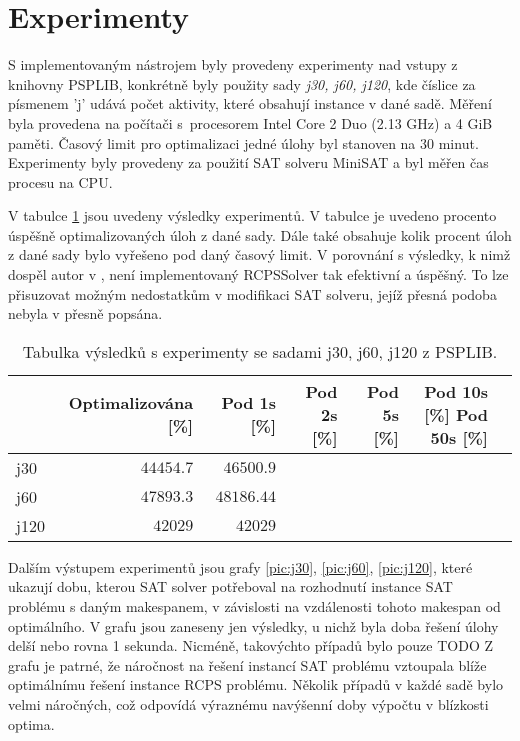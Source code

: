 \documentclass[a4paper, 12pt]{article}
\begin{document}
\section{Experimenty}
S implementovaným nástrojem byly provedeny experimenty nad vstupy
z knihovny PSPLIB, konkrétně byly použity sady \emph{j30, j60, j120}, kde
číslice za písmenem 'j' udává počet aktivity, které obsahují instance v dané sadě.
Měření byla provedena na počítači s~procesorem Intel Core 2 Duo (2.13 GHz) a 4 GiB paměti.
Časový limit pro optimalizaci jedné úlohy byl stanoven na $30$ minut.
Experimenty byly provedeny za použití SAT solveru MiniSAT a byl měřen čas
procesu na CPU.

V tabulce \ref{table:jreses} jsou uvedeny výsledky experimentů.
V tabulce je uvedeno procento úspěšně optimalizovaných úloh z dané sady.
Dále také obsahuje kolik procent úloh z dané sady bylo vyřešeno pod daný časový limit.
V porovnání s výsledky, k nimž dospěl autor v \cite{horbach:10}, není implementovaný
RCPSSolver tak efektivní a úspěšný.
To lze přisuzovat možným nedostatkům v modifikaci SAT solveru, jejíž přesná podoba nebyla
v \cite{horbach:10} přesně popsána.

\begin{table}[tb]
\begin{center}
  \begin{tabular}{ | l | r | r | r | r | r | r |}
   \hline
    & \textbf{Optimalizována [\%]} & Pod 1s [\%] & Pod 2s [\%] & Pod 5s [\%] & Pod 10s [\%] Pod 50s [\%]\\ \hline \hline
    j30 &$44454.7$ & $46500.9$ & & & \\ \hline
    j60 & $47893.3$ & $48186.44$ & & & \\ \hline
    j120 & $42 029$ & $42 029$ & & & \\ \hline
   \end{tabular}
   \caption{Tabulka výsledků s experimenty se sadami j30, j60, j120 z PSPLIB.}
   \label{table:jreses}
\end{center}
\end{table}

Dalším výstupem experimentů jsou grafy \ref{pic:j30}, \ref{pic:j60}, \ref{pic:j120},
které ukazují dobu, kterou SAT solver potřeboval na rozhodnutí instance SAT problému
s daným makespanem, v závislosti na vzdálenosti tohoto makespan od optimálního.
V grafu jsou zaneseny jen výsledky, u nichž byla doba řešení úlohy delší nebo rovna 1 sekunda.
Nicméně, takovýchto případů bylo pouze TODO
Z grafu je patrné, že náročnost na řešení instancí SAT problému vztoupala blíže optimálnímu řešení instance RCPS problému.
Několik případů v každé sadě bylo velmi náročných, což odpovídá výraznému navýšenní doby výpočtu v blízkosti optima.
\end{document}
